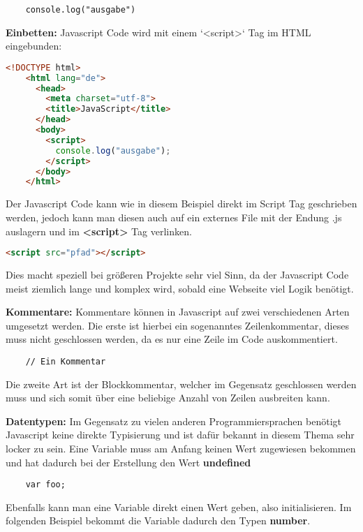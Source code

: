 \begin{lstlisting}
    console.log("ausgabe")
\end{lstlisting}

\textbf{Einbetten:}
\newline
Javascript Code wird mit einem `<script>` Tag im HTML eingebunden:

\begin{lstlisting}[language=html]
    <!DOCTYPE html>
    <html lang="de">
      <head>
        <meta charset="utf-8">
        <title>JavaScript</title>
      </head>
      <body>
        <script>
          console.log("ausgabe");
        </script>
      </body>
    </html>
\end{lstlisting}

Der Javascript Code kann wie in diesem Beispiel direkt im Script Tag geschrieben werden, jedoch kann man diesen auch auf ein externes File mit der Endung .js auslagern und im \textbf{<script>} Tag verlinken. 

\begin{lstlisting}[language=html]
    <script src="pfad"></script>
\end{lstlisting}

Dies macht speziell bei größeren Projekte sehr viel Sinn, da der Javascript Code meist ziemlich lange und komplex wird, sobald eine Webseite viel Logik benötigt.

\textbf{Kommentare:}
\newline
Kommentare können in Javascript auf zwei verschiedenen Arten umgesetzt werden. Die erste ist hierbei ein sogenanntes Zeilenkommentar, dieses muss nicht geschlossen werden, da es nur eine Zeile im Code auskommentiert.

\begin{lstlisting}
    // Ein Kommentar
\end{lstlisting}

Die zweite Art ist der Blockkommentar, welcher im Gegensatz geschlossen werden muss und sich somit über eine beliebige Anzahl von Zeilen ausbreiten kann.


\textbf{Datentypen:}
\newline
Im Gegensatz zu vielen anderen Programmiersprachen benötigt Javascript keine direkte Typisierung und ist dafür bekannt in diesem Thema sehr locker zu sein.
\newline
Eine Variable muss am Anfang keinen Wert zugewiesen bekommen und hat dadurch bei der Erstellung den Wert \textbf{undefined}

\begin{lstlisting}
    var foo;
\end{lstlisting}
\newpage
Ebenfalls kann man eine Variable direkt einen Wert geben, also initialisieren. Im folgenden Beispiel bekommt die Variable dadurch den Typen \textbf{number}.

